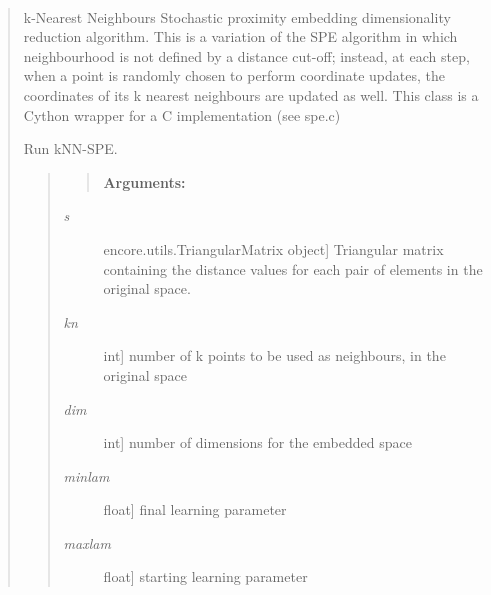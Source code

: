 \documentclass[letterpaper,10pt,english]{sphinxmanual}
\begin{document}
\begin{fulllineitems}
\label{index:encore.dimensionality_reduction.stochasticproxembed.kNNStochasticProximityEmbedding}~\begin{quote}

k-Nearest Neighbours Stochastic proximity embedding dimensionality reduction algorithm.
This is a variation of the SPE algorithm in which neighbourhood is not defined by a distance cut-off; instead, at each step, when a point is randomly chosen to perform coordinate updates, the coordinates of its k nearest neighbours are updated as well.
This class is a Cython wrapper for a C implementation (see spe.c)

\begin{fulllineitems}
\label{index:encore.dimensionality_reduction.stochasticproxembed.kNNStochasticProximityEmbedding.run}
\end{fulllineitems}


Run kNN-SPE.
\begin{quote}
\begin{quote}

\textbf{Arguments:}
\end{quote}
\begin{description}
\item[{\emph{s}}] \leavevmode{[}encore.utils.TriangularMatrix object{]}
Triangular matrix containing the distance values for each pair of elements in the original space.

\item[{\emph{kn}}] \leavevmode{[}int{]}
number of k points to be used as neighbours, in the original space

\item[{\emph{dim}}] \leavevmode{[}int{]}
number of dimensions for the embedded space

\item[{\emph{minlam}}] \leavevmode{[}float{]}
final learning parameter

\item[{\emph{maxlam}}] \leavevmode{[}float{]}
starting learning parameter


\end{description}
\end{quote}
\end{quote}
\end{fulllineitems}
\end{document}
